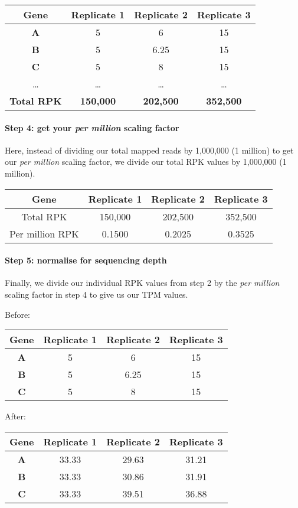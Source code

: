 \documentclass[11pt]{article}
\begin{document}
\begin{longtable}[]{@{}cccc@{}}
\hline
Gene & Replicate 1 & Replicate 2 & Replicate 3\tabularnewline
\hline
\endhead
\textbf{A} & 5 & 6 & 15\tabularnewline
\textbf{B} & 5 & 6.25 & 15\tabularnewline
\textbf{C} & 5 & 8 & 15\tabularnewline
\ldots{} & \ldots{} & \ldots{} & \ldots{}\tabularnewline
\textbf{Total RPK} & \textbf{150,000} & \textbf{202,500} &
\textbf{352,500}\tabularnewline
\hline
\end{longtable}

\hypertarget{step-4-get-your-per-million-scaling-factor}{%
\paragraph{\texorpdfstring{Step 4: get your \textit{per million} scaling
factor}{Step 4: get your per million scaling factor}}\label{step-4-get-your-per-million-scaling-factor}}

Here, instead of dividing our total mapped reads by 1,000,000 (1
million) to get our \textit{per million} scaling factor, we divide our
total RPK values by 1,000,000 (1 million).

\begin{longtable}[]{@{}cccc@{}}
\hline
Gene & Replicate 1 & Replicate 2 & Replicate 3\tabularnewline
\hline
\endhead
Total RPK & 150,000 & 202,500 & 352,500\tabularnewline
Per million RPK & 0.1500 & 0.2025 & 0.3525\tabularnewline
\hline
\end{longtable}

\hypertarget{step-5-normalise-for-sequencing-depth}{%
\paragraph{Step 5: normalise for sequencing
depth}\label{step-5-normalise-for-sequencing-depth}}

Finally, we divide our individual RPK values from step 2 by the
\textit{per million} scaling factor in step 4 to give us our TPM values.

Before:

\begin{longtable}[]{@{}cccc@{}}
\hline
Gene & Replicate 1 & Replicate 2 & Replicate 3\tabularnewline
\hline
\endhead
\textbf{A} & 5 & 6 & 15\tabularnewline
\textbf{B} & 5 & 6.25 & 15\tabularnewline
\textbf{C} & 5 & 8 & 15\tabularnewline
\hline
\end{longtable}

After:

\begin{longtable}[]{@{}cccc@{}}
\hline
Gene & Replicate 1 & Replicate 2 & Replicate 3\tabularnewline
\hline
\endhead
\textbf{A} & 33.33 & 29.63 & 31.21\tabularnewline
\textbf{B} & 33.33 & 30.86 & 31.91\tabularnewline
\textbf{C} & 33.33 & 39.51 & 36.88\tabularnewline
\hline
\end{longtable}
\end{document}
